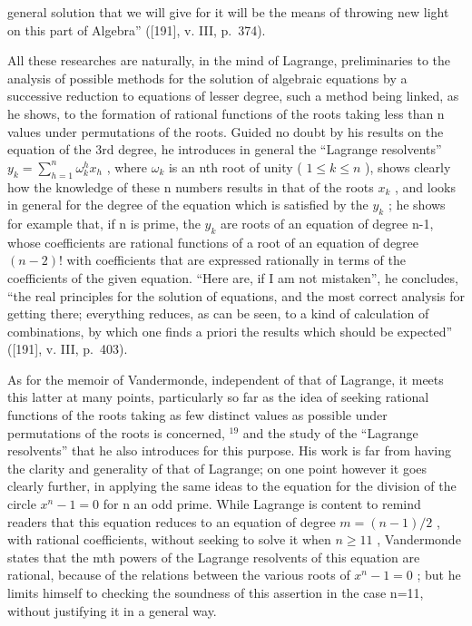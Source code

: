 general solution that we will give for it will be the means of throwing new light on this part of Algebra'' ({[}191{]}, v. III, p.~374).

All these researches are naturally, in the mind of Lagrange, preliminaries to the analysis of possible methods for the solution of algebraic equations by a successive reduction to equations of lesser degree, such a method being linked, as he shows, to the formation of rational functions of the roots taking less than n values under permutations of the roots. Guided no doubt by his results on the equation of the 3rd degree, he introduces in general the ``Lagrange resolvents'' \(y_{k} = \sum_{h=1}^{n} \omega_{k}^{h} x_{h}\) , where \(\omega_{k}\) is an nth root of unity ( \(1 \leq k \leq n\) ), shows clearly how the knowledge of these n numbers results in that of the roots \(x_{k}\) , and looks in general for the degree of the equation which is satisfied by the \(y_{k}\) ; he shows for example that, if n is prime, the \(y_{k}\) are roots of an equation of degree n-1, whose coefficients are rational functions of a root of an equation of degree \((n-2)!\) with coefficients that are expressed rationally in terms of the coefficients of the given equation. ``Here are, if I am not mistaken'', he concludes, ``the real principles for the solution of equations, and the most correct analysis for getting there; everything reduces, as can be seen, to a kind of calculation of combinations, by which one finds a priori the results which should be expected'' ({[}191{]}, v. III, p.~403).

As for the memoir of Vandermonde, independent of that of Lagrange, it meets this latter at many points, particularly so far as the idea of seeking rational functions of the roots taking as few distinct values as possible under permutations of the roots is concerned, \(^{19}\) and the study of the ``Lagrange resolvents'' that he also introduces for this purpose. His work is far from having the clarity and generality of that of Lagrange; on one point however it goes clearly further, in applying the same ideas to the equation for the division of the circle \(x^{n}-1=0\) for n an odd prime. While Lagrange is content to remind readers that this equation reduces to an equation of degree \(m=(n-1)/2\) , with rational coefficients, without seeking to solve it when \(n\geq11\) , Vandermonde states that the mth powers of the Lagrange resolvents of this equation are rational, because of the relations between the various roots of \(x^{n}-1=0\) ; but he limits himself to checking the soundness of this assertion in the case n=11, without justifying it in a general way.

